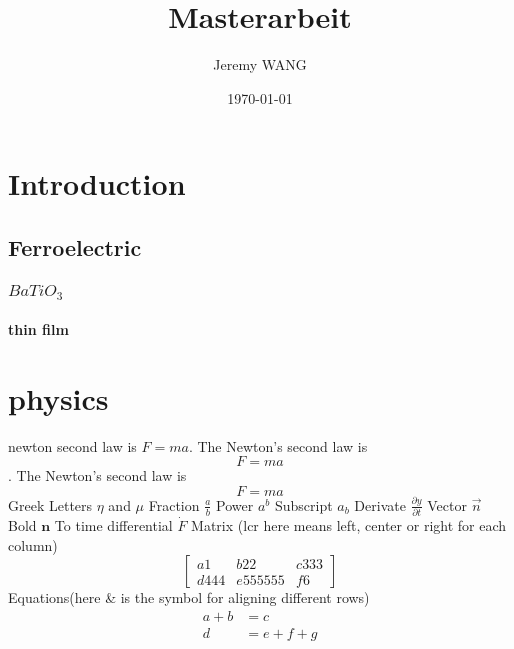 \documentclass[11pt,twoside,a4paper,twocolumn]{article}
\title{Masterarbeit}
\author{Jeremy WANG}
\date{\today}
\begin{document}
\maketitle
\tableofcontents
\section{Introduction}%
\subsection{Ferroelectric}
\subsubsection{$BaTiO_3$}
\paragraph{thin film}

\section{physics}newton second law is $F=ma$.
The Newton's second law is $$F=ma$$.
The Newton's second law is \[F=ma\]
Greek Letters $\eta$ and $\mu$
Fraction $\frac{a}{b}$
Power $a^b$
Subscript $a_b$
Derivate $\frac{\partial y}{\partial t} $
Vector $\vec{n}$
Bold $\mathbf{n}$
To time differential $\dot{F}$
Matrix (lcr here means left, center or right for each column)
\[
\left[
\begin{array}{lcr}
a1 & b22 & c333 \\
d444 & e555555 & f6
\end{array}
\right]
\]
Equations(here \& is the symbol for aligning different rows)
\begin{align}
a+b&=c\\
d&=e+f+g
\end{align}
\end{document}
